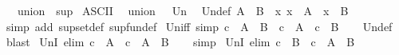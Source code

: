 \begin{isabellebody}
\ \ \ {\isachardoublequoteopen}union\ {\isasymequiv}\ sup{\isachardoublequoteclose}\isanewline
\isanewline
{}\isamarkupfalse%
\ {\isacharparenleft}{\kern0pt}ASCII{\isacharparenright}{\kern0pt}\isanewline
\ \ union\ \ {\isacharparenleft}{\kern0pt}\ {\isachardoublequoteopen}Un{\isachardoublequoteclose}\ {}{}{\isacharparenright}{\kern0pt}\isanewline
\isanewline
{}\isamarkupfalse%
\ Un{\isacharunderscore}{\kern0pt}def{\isacharcolon}{\kern0pt}\ {\isachardoublequoteopen}A\ {\isasymunion}\ B\ {\isacharequal}{\kern0pt}\ {\isacharbraceleft}{\kern0pt}x{\isachardot}{\kern0pt}\ x\ {\isasymin}\ A\ {\isasymor}\ x\ {\isasymin}\ B{\isacharbraceright}{\kern0pt}{\isachardoublequoteclose}\isanewline
%
\isadelimproof
\ \ %
\endisadelimproof
%
\isatagproof
{}\isamarkupfalse%
\ {\isacharparenleft}{\kern0pt}simp\ add{\isacharcolon}{\kern0pt}\ sup{\isacharunderscore}{\kern0pt}set{\isacharunderscore}{\kern0pt}def\ sup{\isacharunderscore}{\kern0pt}fun{\isacharunderscore}{\kern0pt}def{\isacharparenright}{\kern0pt}%
\endisatagproof
{\isafoldproof}%
%
\isadelimproof
\isanewline
%
\endisadelimproof
\isanewline
{}\isamarkupfalse%
\ Un{\isacharunderscore}{\kern0pt}iff\ {\isacharbrackleft}{\kern0pt}simp{\isacharbrackright}{\kern0pt}{\isacharcolon}{\kern0pt}\ {\isachardoublequoteopen}c\ {\isasymin}\ A\ {\isasymunion}\ B\ {\isasymlongleftrightarrow}\ c\ {\isasymin}\ A\ {\isasymor}\ c\ {\isasymin}\ B{\isachardoublequoteclose}\isanewline
%
\isadelimproof
\ \ %
\endisadelimproof
%
\isatagproof
{}\isamarkupfalse%
\ Un{\isacharunderscore}{\kern0pt}def\ \isamarkupfalse%
\ blast%
\endisatagproof
{\isafoldproof}%
%
\isadelimproof
\isanewline
%
\endisadelimproof
\isanewline
{}\isamarkupfalse%
\ UnI{}\ {\isacharbrackleft}{\kern0pt}elim{\isacharquery}{\kern0pt}{\isacharbrackright}{\kern0pt}{\isacharcolon}{\kern0pt}\ {\isachardoublequoteopen}c\ {\isasymin}\ A\ {\isasymLongrightarrow}\ c\ {\isasymin}\ A\ {\isasymunion}\ B{\isachardoublequoteclose}\isanewline
%
\isadelimproof
\ \ %
\endisadelimproof
%
\isatagproof
{}\isamarkupfalse%
\ simp%
\endisatagproof
{\isafoldproof}%
%
\isadelimproof
\isanewline
%
\endisadelimproof
\isanewline
{}\isamarkupfalse%
\ UnI{}\ {\isacharbrackleft}{\kern0pt}elim{\isacharquery}{\kern0pt}{\isacharbrackright}{\kern0pt}{\isacharcolon}{\kern0pt}\ {\isachardoublequoteopen}c\ {\isasymin}\ B\ {\isasymLongrightarrow}\ c\ {\isasymin}\ A\ {\isasymunion}\ B{\isachardoublequoteclose}\isanewline

\end{isabellebody}
